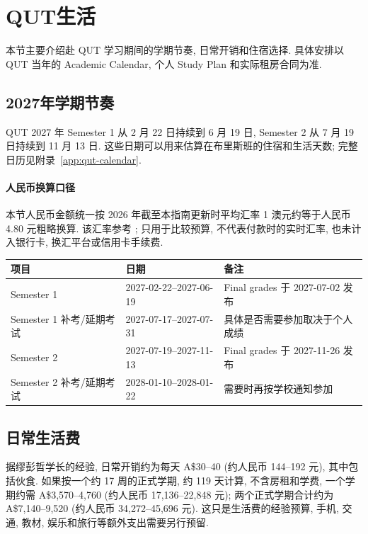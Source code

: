 \documentclass{jit-qut}
\begin{document}
\endgroup

\newpage

\section{QUT生活}\label{sec:qut-life}

本节主要介绍赴 QUT 学习期间的学期节奏, 日常开销和住宿选择. 具体安排以 QUT 当年的 Academic Calendar, 个人 Study Plan 和实际租房合同为准.

\subsection{2027年学期节奏}

QUT 2027 年 Semester 1 从 2 月 22 日持续到 6 月 19 日, Semester 2 从 7 月 19 日持续到 11 月 13 日. 这些日期可以用来估算在布里斯班的住宿和生活天数; 完整日历见附录~\ref{app:qut-calendar}.

\paragraph{人民币换算口径} 本节人民币金额统一按 2026 年截至本指南更新时平均汇率 1 澳元约等于人民币 4.80 元粗略换算. 该汇率参考 ; 只用于比较预算, 不代表付款时的实时汇率, 也未计入银行卡, 换汇平台或信用卡手续费.

\scriptsize
\renewcommand{\arraystretch}{1.15}
\begin{longtable}{p{}p{}p{}}
\toprule
项目 & 日期 & 备注 \\
\midrule
\endhead
\bottomrule
\endfoot
Semester 1 & 2027-02-22--2027-06-19 & Final grades 于 2027-07-02 发布 \\
Semester 1 补考/延期考试 & 2027-07-17--2027-07-31 & 具体是否需要参加取决于个人成绩 \\
Semester 2 & 2027-07-19--2027-11-13 & Final grades 于 2027-11-26 发布 \\
Semester 2 补考/延期考试 & 2028-01-10--2028-01-22 & 需要时再按学校通知参加 \\
\end{longtable}
\normalsize

\subsection{日常生活费}

据缪彭哲学长的经验, 日常开销约为每天 A\$30--40 (约人民币 144--192 元), 其中包括伙食. 如果按一个约 17 周的正式学期, 约 119 天计算, 不含房租和学费, 一个学期约需 A\$3,570--4,760 (约人民币 17,136--22,848 元); 两个正式学期合计约为 A\$7,140--9,520 (约人民币 34,272--45,696 元). 这只是生活费的经验预算, 手机, 交通, 教材, 娱乐和旅行等额外支出需要另行预留.
\end{document}
